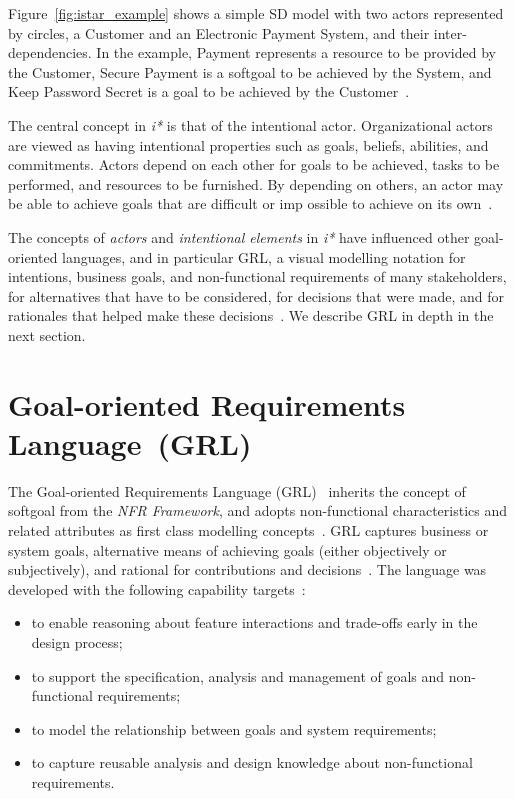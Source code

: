 \documentclass[dissertation,final]{softeng}
\begin{document}
Figure~\ref{fig:istar_example} shows a simple SD model with two actors represented by circles, a Customer and an Electronic Payment System, and their inter-dependencies. In the example, Payment represents a resource to be provided by the Customer, Secure Payment is a softgoal to be achieved by the System, and Keep Password Secret is a goal to be achieved by the Customer~\citep{Roy:2007wyba}.

The central concept in \emph{i*} is that of the intentional actor. Organizational actors are viewed as having intentional properties such as goals, beliefs, abilities, and commitments. Actors depend on each other for goals to be achieved, tasks to be performed, and resources to be furnished. By depending on others, an actor may be able to achieve goals that are difficult or imp 	ossible to achieve on its own~\citep{Yu1997}.

The concepts of \emph{actors} and \emph{intentional elements} in \emph{i*} have influenced other goal-oriented languages, and in particular GRL, a visual modelling notation for intentions, business goals, and non-functional requirements of many stakeholders, for alternatives that have to be considered, for decisions that were made, and for rationales that helped make these decisions~\citep{amyot2011user}. We describe GRL in depth in the next section.

\section{Goal-oriented Requirements Language~(GRL)}
\label{sec:gore}
The Goal-oriented Requirements Language (GRL)~\citep{Amyot2010} inherits the concept of softgoal from the \emph{NFR Framework}, and adopts non-functional characteristics and related attributes as first class modelling concepts~\citep{Chung:2009vg}. GRL captures business or system goals, alternative means of achieving goals (either objectively or subjectively), and rational for contributions and decisions~\citep{Amyot2003}. The language was developed with the following capability targets~\citep{Amyot2003}:

\begin{itemize}
\item to enable reasoning about feature interactions and trade-offs early in the design process;
\item to support the specification, analysis and management of goals and non-functional requirements;
\item to model the relationship between goals and system requirements;
\item to capture reusable analysis and design knowledge about non-functional requirements.
\end{itemize}
\end{document}
